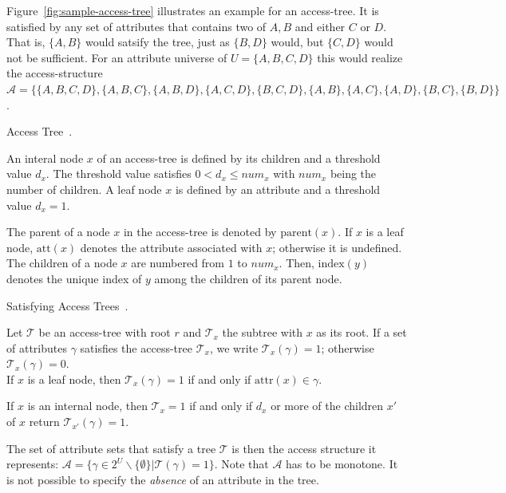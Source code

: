 Figure~\ref{fig:sample-access-tree} illustrates an example for an \gls{access-tree}. It is satisfied by any set of attributes that contains two of $A, B$ and either $C$ or $D$.
That is, $\{A,B\}$ would satsify the tree, just as $\{B, D\}$ would, but $\{C, D\}$ would not be sufficient.
For an attribute universe of $U = \{A, B, C, D\}$ this would realize the \gls{access-structure} $\mathcal{A} = \{\{A, B, C, D\}, \{A, B, C\}, \{A, B, D\},\{A, C, D\}, \{B, C, D\}, \{A, B\},\{A, C\},\{A,D\}, \{B, C\},\{B, D\}\}$.

\begin{definition}
    Access Tree~\cite{goyal_attribute-based_2006}.

    An interal node $x$ of an \gls{access-tree} is defined by its children and a threshold value $d_x$.
    The threshold value satisfies $0 < d_x \leq num_x$ with $num_x$ being the number of children.
    A leaf node $x$ is defined by an attribute and a threshold value $d_x = 1$.

    The parent of a node $x$ in the \gls{access-tree} is denoted by $\text{parent}(x)$.
    If $x$ is a leaf node, $\text{att}(x)$ denotes the attribute associated with $x$; otherwise it is undefined.
    The children of a node $x$ are numbered from $1$ to $num_x$. Then, $\text{index}(y)$ denotes the unique index of $y$ among the children of its parent node.
\end{definition}

\begin{definition}
    Satisfying Access Trees~\cite{goyal_attribute-based_2006}.

    Let $\mathcal{T}$ be an \gls{access-tree} with root $r$ and $\mathcal{T}_x$ the subtree with $x$ as its root.
    If a set of attributes $\gamma$ satisfies the \gls{access-tree} $\mathcal{T}_x$, we write $\mathcal{T}_x(\gamma) = 1$; otherwise $\mathcal{T}_x(\gamma) = 0$.\\
    If $x$ is a leaf node, then $\mathcal{T}_x(\gamma) = 1$ if and only if $\text{attr}(x) \in \gamma$.
    
    If $x$ is an internal node, then $\mathcal{T}_x = 1$ if and only if $d_x$ or more of the children $x'$ of $x$ return $\mathcal{T}_{x'}(\gamma) = 1$.
\end{definition}
The set of attribute sets that satisfy a tree $\mathcal{T}$ is then the access structure it represents: $\mathcal{A} = \{\gamma \in 2^U \backslash \{\emptyset\}| \mathcal{T}(\gamma) = 1\}$.
Note that $\mathcal{A}$ has to be monotone. It is not possible to specify the \emph{absence} of an attribute in the tree.

